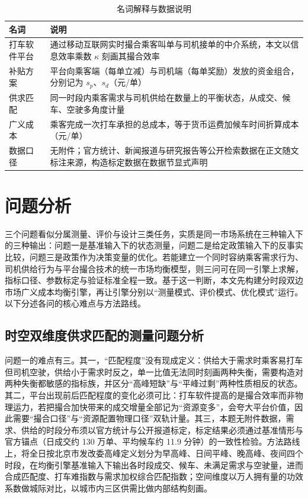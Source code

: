 \documentclass[12pt,a4paper]{ctexart}
\begin{document}
\begin{table}[H]
\centering
\caption{名词解释与数据说明}
\label{tab:terms}
\begin{tabular}{p{3.2cm}p{10.5cm}}
\toprule
名词 & 说明 \\
\midrule
打车软件平台 & 通过移动互联网实时撮合乘客叫单与司机接单的中介系统，本文以信息效率乘数 $\kappa$ 刻画其撮合效率 \\
补贴方案 & 平台向乘客端（每单立减）与司机端（每单奖励）发放的资金组合，分别记为 $s_p$、$s_d$（元/单） \\
供求匹配 & 同一时段内乘客需求与司机供给在数量上的平衡状态，从成交、候车、空驶多角度计量 \\
广义成本 & 乘客完成一次打车承担的总成本，等于货币运费加候车时间折算成本（元/单） \\
数据口径 & 无附件；官方统计、新闻报道与研究报告等公开检索数据在正文随文标注来源，构造标定数据在数据节显式声明 \\
\bottomrule
\end{tabular}
\end{table}

\section{问题分析}

三个问题看似分属测量、评价与设计三类任务，实质是同一市场系统在三种输入下的三种输出：问题一是基准输入下的状态测量，问题二是给定政策输入下的反事实比较，问题三是政策作为决策变量的优化。若能建立一个同时容纳乘客需求行为、司机供给行为与平台撮合技术的统一市场均衡模型，则三问可在同一引擎上求解，指标口径、参数标定与验证标准全程一致。基于这一判断，本文先构建分时段双边市场广义成本均衡引擎，再让引擎分别以“测量模式、评价模式、优化模式”运行。以下分述各问的核心难点与方法路线。

\subsection{时空双维度供求匹配的测量问题分析}

问题一的难点有三。其一，“匹配程度”没有现成定义：供给大于需求时乘客易打车但司机空驶，供给小于需求时反之，单一比值无法同时刻画两种失衡，需要构造对两种失衡都敏感的指标族，并区分“高峰短缺”与“平峰过剩”两种性质相反的状态。其二，平台出现前后匹配程度的变化必须可比：打车软件提高的是撮合效率而非物理运力，若把撮合加快带来的成交增量全部记为“资源变多”，会夸大平台价值，因此需要“撮合口径”与“资源配置物理口径”双轨计量。其三，本题无附件数据，需求、供给的时段分布须以官方统计与公开报道标定，标定结果必须通过基准情形与官方锚点（日成交约 130 万单、平均候车约 11.9 分钟）的一致性检验。方法路线上，将全日按北京市发改委高峰定义划分为早高峰、日间平峰、晚高峰、夜间四个时段，在均衡引擎基准输入下输出各时段成交、候车、未满足需求与空驶量，进而合成匹配度、打车难指数与需求加权综合匹配指数；空间维度以万人拥有量的功效系数做城际对比，以城市内三区供需比做内部结构刻画。
\end{document}
